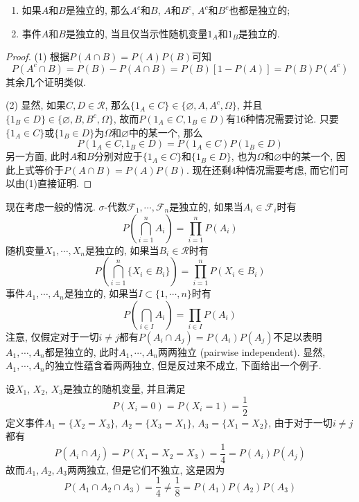 \documentclass[cn, 12pt, math=mtpro2, bibstyle=apa, blue, twocol]{elegantbook}
\newcommand{\F}{\mathcal{F}}
\let\emptyset\varnothing
\begin{document}
\begin{theorem}
  \begin{enumerate}[label=(\arabic*)]
    \item 如果$A$和$B$是独立的, 那么$A^c$和$B$, $A$和$B^c$, $A^c$和$B^c$也都是独立的;
    \item 事件$A$和$B$是独立的, 当且仅当示性随机变量$1_A$和$1_B$是独立的.
  \end{enumerate}
\end{theorem}
\begin{proof}
  (1) 根据$P(A\cap B)=P(A)P(B)$可知
  $$P(A^c\cap B)=P(B)-P(A\cap B)=P(B)[1-P(A)]=P(B)P(A^c)$$
  其余几个证明类似.

  (2) 显然, 如果$C,D\in\mathcal{R}$, 那么$\{1_A\in C\}\in \{\emptyset,A,A^c,\Omega\}$, 并且$\{1_B\in D\}\in\{\emptyset,B,B^c,\Omega\}$, 故而$P(1_A\in C, 1_B\in D)$有16种情况需要讨论. 只要$\{1_A\in C\}$或$\{1_B\in D\}$为$\Omega$和$\emptyset$中的某一个, 那么
  $$P(1_A\in C, 1_B\in D)=P(1_A\in C)P(1_B\in D)$$
  另一方面, 此时$A$和$B$分别对应于$\{1_A\in C\}$和$\{1_B\in D\}$, 也为$\Omega$和$\emptyset$中的某一个, 因此上式等价于$P(A\cap B)=P(A)P(B)$. 现在还剩4种情况需要考虑, 而它们可以由(1)直接证明.
 \end{proof}

现在考虑一般的情况. $\sigma$-代数$\F_1,\cdots,\F_n$是独立的, 如果当$A_i\in \F_i$时有
$$P\left(\bigcap_{i=1}^n A_i\right)=\prod_{i=1}^{n}P(A_i)$$
随机变量$X_1,\cdots,X_n$是独立的, 如果当$B_i\in\mathcal{R}$时有
$$P\left(\bigcap_{i=1}^n\{X_i\in B_i\}\right)=\prod_{i=1}^{n}P(X_i\in B_i)$$
事件$A_1,\cdots,A_n$是独立的, 如果当$I\subset\{1,\cdots,n\}$时有
$$P\left(\bigcap_{i\in I}A_i\right)=\prod_{i\in I}P(A_i)$$
注意, 仅假定对于一切$i\neq j$都有$P(A_i\cap A_j)=P(A_i)P(A_j)$不足以表明$A_1,\cdots,A_n$都是独立的, 此时$A_1,\cdots,A_n$两两独立 (pairwise independent). 显然, $A_1, \cdots,A_n$的独立性蕴含着两两独立, 但是反过来不成立, 下面给出一个例子.

\begin{example}
设$X_1$, $X_2$, $X_3$是独立的随机变量, 并且满足
$$P(X_i=0)=P(X_i=1)=\frac{1}{2}$$
定义事件$A_1=\{X_2=X_3\}$, $A_2=\{X_3=X_1\}$, $A_3=\{X_1=X_2\}$, 由于对于一切$i\neq j$都有
$$P(A_i\cap A_j)=P(X_1=X_2=X_3)=\frac{1}{4}=P(A_i)P(A_j)$$
故而$A_1,A_2,A_3$两两独立, 但是它们不独立, 这是因为
$$P(A_1\cap A_2\cap A_3)=\frac{1}{4}\neq \frac{1}{8}=P(A_1)P(A_2)P(A_3)$$
\end{example}
\end{document}
